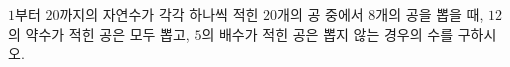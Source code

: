 \hspace*{2mm}\begin{minipage}[t]{\dimexpr\linewidth-2mm\relax}\vspace{0pt}
$1$부터 $20$까지의 자연수가 각각 하나씩 적힌 $20$개의 공 중에서 $8$개의 공을 뽑을 때, $12$의 약수가 적힌 공은 모두 뽑고, $5$의 배수가 적힌 공은 뽑지 않는 경우의 수를 구하시오.\end{minipage}
